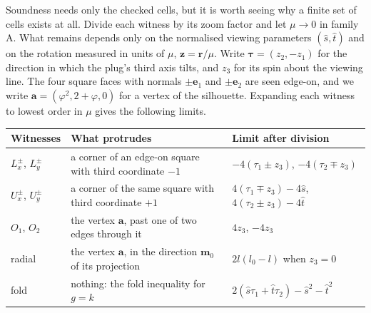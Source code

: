 \begin{remark}\label{rem:square-finitely-many-cells}
Soundness needs only the checked cells, but it is worth seeing why a
finite set of cells exists at all. Divide each witness by its zoom factor
and let $\mu\to0$ in family A. What remains depends only on the normalised
viewing parameters $(\widehat s,\widehat t)$ and on the rotation measured in
units of $\mu$, $\mathbf z=\mathbf r/\mu$. Write $\boldsymbol\tau=(z_2,-z_1)$ for the
direction in which the plug's third axis tilts, and $z_3$ for its spin about
the viewing line. The four square faces with normals $\pm\mathbf e_1$ and
$\pm\mathbf e_2$ are seen edge-on, and we write $\mathbf a=(\varphi^2,2+\varphi,0)$
for a vertex of the silhouette. Expanding each witness to lowest order in
$\mu$ gives the following limits.

\begin{center}
\small
\begin{tabular}{lll}
  \toprule
  Witnesses & What protrudes & Limit after division\\
  \midrule
  $L_x^\pm$, $L_y^\pm$ & a corner of an edge-on square with third coordinate $-1$ &
    $-4(\tau_1\pm z_3)$, $-4(\tau_2\mp z_3)$\\
  $U_x^\pm$, $U_y^\pm$ & a corner of the same square with third coordinate $+1$ &
    $4(\tau_1\mp z_3)-4\widehat s$, $4(\tau_2\pm z_3)-4\widehat t$\\
  $O_1$, $O_2$ & the vertex $\mathbf a$, past one of two edges through it &
    $4z_3$, $-4z_3$\\
  radial & the vertex $\mathbf a$, in the direction $\mathbf m_0$ of its projection &
    $2l(l_0-l)$ when $z_3=0$\\
  fold & nothing: the fold inequality for $g=k$ &
    $2(\widehat s\tau_1+\widehat t\tau_2)-\widehat s^2-\widehat t^2$\\
  \bottomrule
\end{tabular}
\end{center}


\end{remark}
